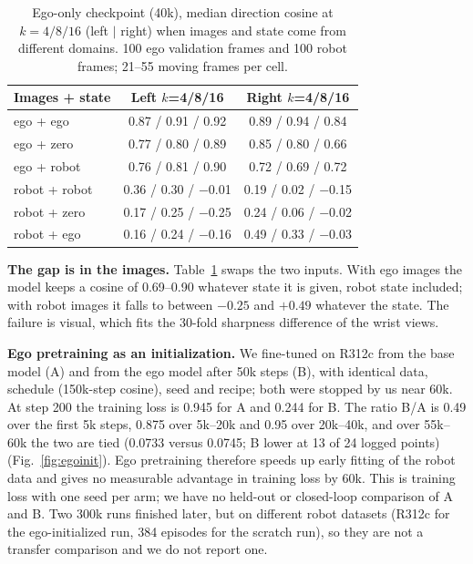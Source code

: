 \documentclass[conference,10pt]{IEEEtran}
\begin{document}
\begin{table}[t]
\centering\footnotesize\setlength{\tabcolsep}{3.2pt}
\caption{Ego-only checkpoint (40k), median direction cosine at $k{=}4/8/16$ (left $|$ right) when images and state come from
different domains. 100 ego validation frames and 100 robot frames; 21--55 moving frames per cell.}
\label{tab:ablation}
\begin{tabular}{@{}lcc@{}}
\toprule
Images + state & Left $k$=4/8/16 & Right $k$=4/8/16 \\
\midrule
ego + ego & 0.87 / 0.91 / 0.92 & 0.89 / 0.94 / 0.84 \\
ego + zero & 0.77 / 0.80 / 0.89 & 0.85 / 0.80 / 0.66 \\
ego + robot & 0.76 / 0.81 / 0.90 & 0.72 / 0.69 / 0.72 \\
robot + robot & 0.36 / 0.30 / $-$0.01 & 0.19 / 0.02 / $-$0.15 \\
robot + zero & 0.17 / 0.25 / $-$0.25 & 0.24 / 0.06 / $-$0.02 \\
robot + ego & 0.16 / 0.24 / $-$0.16 & 0.49 / 0.33 / $-$0.03 \\
\bottomrule
\end{tabular}
\end{table}

\textbf{The gap is in the images.} Table~\ref{tab:ablation} swaps the two inputs. With ego images the model keeps a cosine of
0.69--0.90 whatever state it is given, robot state included; with robot images it falls to between $-0.25$ and $+0.49$ whatever
the state. The failure is visual, which fits the 30-fold sharpness difference of the wrist views.

\textbf{Ego pretraining as an initialization.} We fine-tuned on R312c from the base model (A) and from the ego model after 50k
steps (B), with identical data, schedule (150k-step cosine), seed and recipe; both were stopped by us near 60k. At step 200 the
training loss is 0.945 for A and 0.244 for B. The ratio B/A is 0.49 over the first 5k steps, 0.875 over 5k--20k and 0.95 over
20k--40k, and over 55k--60k the two are tied (0.0733 versus 0.0745; B lower at 13 of 24 logged points)
(Fig.~\ref{fig:egoinit}). Ego pretraining therefore speeds up early fitting of the robot data and gives no measurable advantage
in training loss by 60k. This is training loss with one seed per arm; we have no held-out or closed-loop comparison of A and B.
Two 300k runs finished later, but on different robot datasets (R312c for the ego-initialized run, 384 episodes for the
scratch run), so they are not a transfer comparison and we do not report one.
\end{document}
